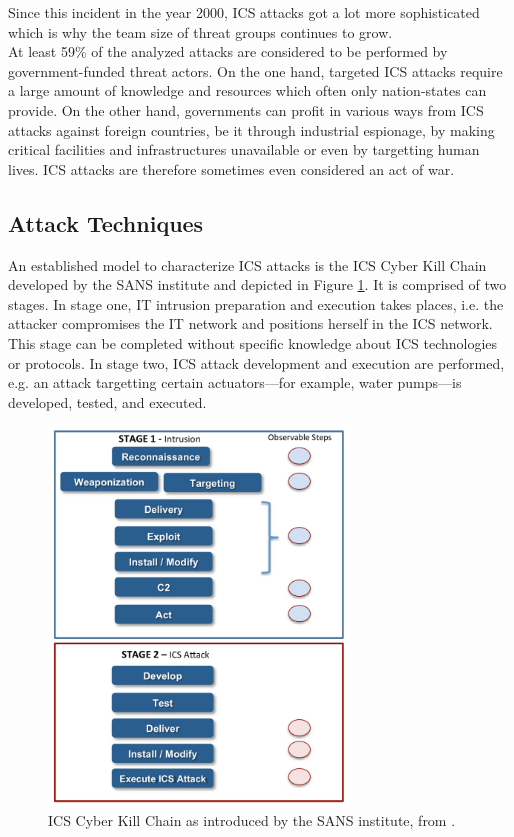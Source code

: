 \documentclass[runningheads]{llncs}
\begin{document}
Since this incident in the year 2000, ICS attacks got a lot more sophisticated which is why the team size of threat groups continues to grow.\\
At least 59\% of the analyzed attacks are considered to be performed by government-funded threat actors.
On the one hand, targeted ICS attacks require a large amount of knowledge and resources which often only nation-states can provide.
On the other hand, governments can profit in various ways from ICS attacks against foreign countries, be it through industrial espionage, by making critical facilities and infrastructures unavailable or even by targetting human lives.
ICS attacks are therefore sometimes even considered an act of war. %

\subsection{Attack Techniques}
An established model to characterize ICS attacks is the ICS Cyber Kill Chain developed by the SANS institute and depicted in Figure \ref{fig:CyberKillChain}.
It is comprised of two stages.
In stage one, IT intrusion preparation and execution takes places, i.e. the attacker compromises the IT network and positions herself in the ICS network.
This stage can be completed without specific knowledge about ICS technologies or protocols.
In stage two, ICS attack development and execution are performed, e.g. an attack targetting certain actuators---for example, water pumps---is developed, tested, and executed.
\begin{figure}[H]
    \centering
    \includegraphics[width=8cm]{figures/ICSCyberKillChain.png}
    \caption{ICS Cyber Kill Chain as introduced by the SANS institute, from \cite{assante.15}.}
    \label{fig:CyberKillChain}
\end{figure}\noindent
\end{document}
